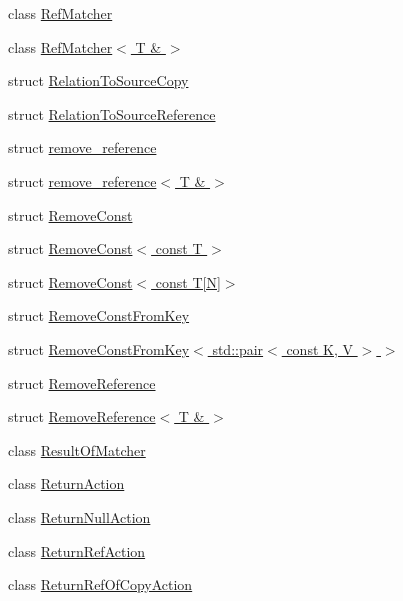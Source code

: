 \begin{DoxyCompactItemize}
class \hyperlink{classtesting_1_1internal_1_1RefMatcher}{Ref\+Matcher}
\item 
class \hyperlink{classtesting_1_1internal_1_1RefMatcher_3_01T_01_6_01_4}{Ref\+Matcher$<$ T \& $>$}
\item 
struct \hyperlink{structtesting_1_1internal_1_1RelationToSourceCopy}{Relation\+To\+Source\+Copy}
\item 
struct \hyperlink{structtesting_1_1internal_1_1RelationToSourceReference}{Relation\+To\+Source\+Reference}
\item 
struct \hyperlink{structtesting_1_1internal_1_1remove__reference}{remove\+\_\+reference}
\item 
struct \hyperlink{structtesting_1_1internal_1_1remove__reference_3_01T_01_6_01_4}{remove\+\_\+reference$<$ T \& $>$}
\item 
struct \hyperlink{structtesting_1_1internal_1_1RemoveConst}{Remove\+Const}
\item 
struct \hyperlink{structtesting_1_1internal_1_1RemoveConst_3_01const_01T_01_4}{Remove\+Const$<$ const T $>$}
\item 
struct \hyperlink{structtesting_1_1internal_1_1RemoveConst_3_01const_01T[N]_4}{Remove\+Const$<$ const T\mbox{[}\+N\mbox{]}$>$}
\item 
struct \hyperlink{structtesting_1_1internal_1_1RemoveConstFromKey}{Remove\+Const\+From\+Key}
\item 
struct \hyperlink{structtesting_1_1internal_1_1RemoveConstFromKey_3_01std_1_1pair_3_01const_01K_00_01V_01_4_01_4}{Remove\+Const\+From\+Key$<$ std\+::pair$<$ const K, V $>$ $>$}
\item 
struct \hyperlink{structtesting_1_1internal_1_1RemoveReference}{Remove\+Reference}
\item 
struct \hyperlink{structtesting_1_1internal_1_1RemoveReference_3_01T_01_6_01_4}{Remove\+Reference$<$ T \& $>$}
\item 
class \hyperlink{classtesting_1_1internal_1_1ResultOfMatcher}{Result\+Of\+Matcher}
\item 
class \hyperlink{classtesting_1_1internal_1_1ReturnAction}{Return\+Action}
\item 
class \hyperlink{classtesting_1_1internal_1_1ReturnNullAction}{Return\+Null\+Action}
\item 
class \hyperlink{classtesting_1_1internal_1_1ReturnRefAction}{Return\+Ref\+Action}
\item 
class \hyperlink{classtesting_1_1internal_1_1ReturnRefOfCopyAction}{Return\+Ref\+Of\+Copy\+Action}
\item 

\end{DoxyCompactItemize}

